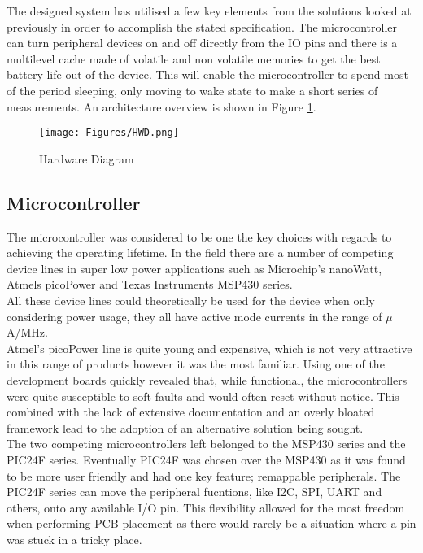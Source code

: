 \documentclass[12pt,openany,a4paper]{book}
\begin{document}
		The designed system has utilised a few key elements from the solutions looked at previously in order to accomplish the stated specification. The microcontroller can turn peripheral devices on and off directly from the IO pins and there is a multilevel cache made of volatile and non volatile memories to get the best battery life out of the device. This will enable the microcontroller to spend most of the period sleeping, only moving to wake state to make a short series of measurements. An architecture overview is shown in Figure \ref{fig:HWD}.
		
		\begin{figure}[H]
			\centering
			\texttt{[image: Figures/HWD.png]}
			\caption{Hardware Diagram}
			\label{fig:HWD}
		\end{figure}		
		\newpage
		
		\subsection{Microcontroller}
		The microcontroller was considered to be one the key choices with regards to achieving the operating lifetime. In the field there are a number of competing device lines in super low power applications such as Microchip's nanoWatt, Atmels picoPower and Texas Instruments MSP430 series. \\
		
		All these device lines could theoretically be used for the device when only considering power usage, they all have active mode currents in the range of $\mu$A/MHz. \\
		
		Atmel's picoPower line is quite young and expensive, which is not very attractive in this range of products however it was the most familiar. Using one of the development boards quickly revealed that, while functional, the microcontrollers were quite susceptible to soft faults and would often reset without notice. This combined with the lack of extensive documentation and an overly bloated framework lead to the adoption of an alternative solution being sought. \\
		
		The two competing microcontrollers left belonged to the MSP430 series and the PIC24F series. Eventually PIC24F was chosen over the MSP430 as it was found to be more user friendly and had one key feature; remappable peripherals. The PIC24F series can move the peripheral fucntions, like I2C, SPI, UART and others, onto any available I/O pin. This flexibility allowed for the most freedom when performing PCB placement as there would rarely be a situation where a pin was stuck in a tricky place. \\
		
\end{document}
